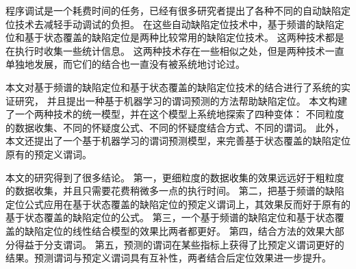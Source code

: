
\begin{cabstract}

程序调试是一个耗费时间的任务，已经有很多研究者提出了各种不同的自动缺陷定位技术去减轻手动调试的负担。
在这些自动缺陷定位技术中，基于频谱的缺陷定位和基于状态覆盖的缺陷定位是两种比较常用的缺陷定位技术。
这两种技术都是在执行时收集一些统计信息。
这两种技术存在一些相似之处，但是两种技术一直单独地发展，而它们的结合也一直没有被系统地讨论过。

本文对基于频谱的缺陷定位和基于状态覆盖的缺陷定位技术的结合进行了系统的实证研究，
并且提出一种基于机器学习的谓词预测的方法帮助缺陷定位。
本文构建了一个两种技术的统一模型，并在这个模型上系统地探索了四种变体：
不同粒度的数据收集、不同的怀疑度公式、不同的怀疑度结合方式、不同的谓词。
此外，本文还提出了一个基于机器学习的谓词预测模型，来完善基于状态覆盖的缺陷定位原有的预定义谓词。

本文的研究得到了很多结论。
第一，更细粒度的数据收集的效果远远好于粗粒度的数据收集，并且只需要花费稍微多一点的执行时间。
第二，把基于频谱的缺陷定位公式应用在基于状态覆盖的缺陷定位的预定义谓词上，其效果反而好于原有的基于状态覆盖的缺陷定位的公式。
第三，一个基于频谱的缺陷定位和基于状态覆盖的缺陷定位的线性结合模型的效果比两者都更好。
第四，结合方法的效果大部分得益于分支谓词。
第五，预测的谓词在某些指标上获得了比预定义谓词更好的结果。预测谓词与预定义谓词具有互补性，两者结合后定位效果进一步提升。

\end{cabstract}


